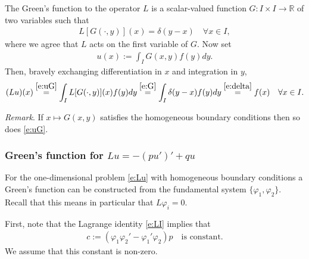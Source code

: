 \documentclass[12pt,a4paper]{article}
\newcommand{\from}{\colon}
\newcommand{\IR}{\mathbb{R}}
\begin{document}
    
    The Green's function to the operator $L$ 
    is a scalar-valued function 
    $G \from I \times I \to \IR$
    of two variables
    such that
    \begin{align}
        \label{e:G}
        L [ G(\cdot, y) ](x)
        =
        \delta(y - x)
        \quad
        \forall x \in I
        ,
    \end{align}
    where we agree that $L$ acts on the first variable of $G$.
    Now set
    \begin{align}
        \label{e:uG}
        u(x) := \int_I G(x, y) f(y) dy
        .
    \end{align}
    Then, bravely exchanging differentiation in $x$ and integration in $y$,
    \begin{align}
        (L u)(x)
        \stackrel{\eqref{e:uG}}{=}
        \int_I L[ G(\cdot, y) ](x) f(y) dy
        \stackrel{\eqref{e:G}}{=}
        \int_I \delta(y - x) f(y) dy
        \stackrel{\eqref{e:delta}}{=}
        f(x)
        \quad
        \forall x \in I
        .
    \end{align}

    
    \emph{Remark}.
    If $x \mapsto G(x, y)$ satisfies
    the homogeneous boundary conditions
    then so does \eqref{e:uG}.
    
    
    \subsubsection*{Green's function for $L u = -(p u')' + q u$}
    
    For the one-dimensional problem \eqref{e:Lu}
    with homogeneous boundary conditions
    a Green's function can be constructed
    from the fundamental system $\{ \varphi_1, \varphi_2 \}$.
    Recall that this means in particular that $L \varphi_i = 0$.
    
    
    First, note that
    the Lagrange identity \eqref{e:LI}
    implies that 
    \begin{align}
        \label{e:c}
        c := (\varphi_1 \varphi_2' - \varphi_1' \varphi_2) p
        \quad
        \text{is constant}.
    \end{align}
    We assume that this constant is non-zero.
\end{document}
